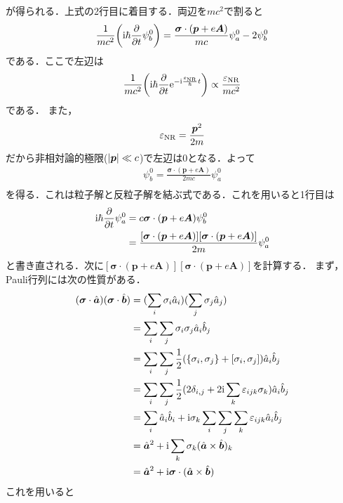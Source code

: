 \documentclass{report}
\begin{document}
が得られる．上式の2行目に着目する．両辺を$mc^2$で割ると
\begin{align}
  \frac{1}{mc^2}\qty(\mathrm{i}\hbar\frac{\partial}{\partial t}\psi_b^0) = \frac{\bm{\sigma}\cdot(\bm{p} + e\bm{A})}{mc}\psi^0_a - 2 \psi^0_b
\end{align}
である．ここで左辺は
\begin{align}
  \frac{1}{mc^2}\qty(\mathrm{i}\hbar\frac{\partial}{\partial t}\mathrm{e}^{-\mathrm{i}\frac{\varepsilon_{\mathrm{NR}}}{\hbar} t}) \propto \frac{\varepsilon_{\mathrm{NR}}}{mc^2}
\end{align}
である．
また，
\begin{align}
  \varepsilon_{\mathrm{NR}} = \frac{\bm{p}^2}{2m}
\end{align}
だから非相対論的極限($\abs{\bm{p}} \ll c$)で左辺は0となる．よって
\begin{align}
  \psi_b^0 = \frac{\bm{\sigma}\cdot(\bm{p} + e\bm{A})}{2mc}\psi^0_a\\
\end{align}
を得る．これは粒子解と反粒子解を結ぶ式である．これを用いると1行目は
\begin{align}
  \mathrm{i}\hbar\frac{\partial}{\partial t}\psi^0_a &= c\bm{\sigma} \cdot (\bm{p} + e\bm{A})\psi_b^0\\
  &= \frac{[\bm{\sigma}\cdot(\bm{p} + e\bm{A})][\bm{\sigma}\cdot(\bm{p} + e\bm{A})]}{2m}\psi^0_a
\end{align}
と書き直される．次に$[\bm{\sigma}\cdot(\bm{p} + e\bm{A})][\bm{\sigma}\cdot(\bm{p} + e\bm{A})]$を計算する．
まず，Pauli行列には次の性質がある．
\begin{align}
  (\bm{\sigma}\cdot\hat{\bm{a}})(\bm{\sigma}\cdot\hat{\bm{b}}) &= (\sum_{i} \sigma_i \hat{a}_i) (\sum_{j} \sigma_j \hat{a}_j)\\
  &= \sum_{i} \sum_{j} \sigma_{i} \sigma_{j} \hat{a}_i \hat{b}_j\\
  &= \sum_{i} \sum_{j} \frac{1}{2}(\qty{\sigma_i, \sigma_j} + [\sigma_i, \sigma_j]) \hat{a}_i \hat{b}_j\\
  &= \sum_{i} \sum_{j} \frac{1}{2}(2 \delta_{i,j} + 2\mathrm{i} \sum_{k} \varepsilon_{ijk} \sigma_k) \hat{a}_i \hat{b}_j\\
  &= \sum_{i} \hat{a}_i \hat{b}_i + \mathrm{i} \sigma_k \sum_{i} \sum_{j} \sum_{k} \varepsilon_{ijk} \hat{a}_i \hat{b}_j\\
  &= \hat{\bm{a}}^2 + \mathrm{i} \sum_{k} \sigma_k (\hat{\bm{a}} \times \hat{\bm{b}})_k\\
  &= \hat{\bm{a}}^2 + \mathrm{i} \bm{\sigma} \cdot (\hat{\bm{a}} \times \hat{\bm{b}})
\end{align}
これを用いると
\end{document}
